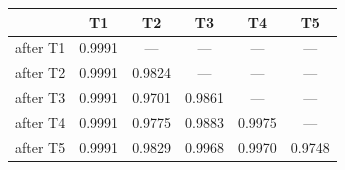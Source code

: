 \begin{tabular}{@{}lccccc@{}}
\toprule
& \textbf{T1} & \textbf{T2} & \textbf{T3} & \textbf{T4} & \textbf{T5} \\
\midrule
after T1 & 0.9991 & --- & --- & --- & --- \\
after T2 & 0.9991 & 0.9824 & --- & --- & --- \\
after T3 & 0.9991 & 0.9701 & 0.9861 & --- & --- \\
after T4 & 0.9991 & 0.9775 & 0.9883 & 0.9975 & --- \\
after T5 & 0.9991 & 0.9829 & 0.9968 & 0.9970 & 0.9748 \\
\bottomrule
\end{tabular}
